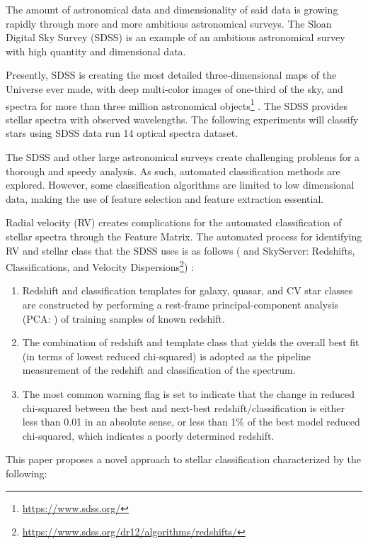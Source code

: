 \documentclass[trackchanges, floatfix, twocolumn, tighten]{aastex62}
\begin{document}
The amount of astronomical data and dimensionality of said data is growing rapidly through more and more ambitious astronomical surveys. The Sloan Digital Sky Survey (SDSS) is an example of an ambitious astronomical survey with high quantity and dimensional data. 

Presently, SDSS is creating the most detailed three-dimensional maps of the Universe ever made, with deep multi-color images of one-third of the sky, and spectra for more than three million astronomical objects\footnote{\url{https://www.sdss.org/}} \cite{York}. The SDSS provides stellar spectra with observed wavelengths. The following experiments will classify stars using SDSS data run 14 optical spectra dataset. 

The SDSS and other large astronomical surveys create challenging problems for a thorough and speedy analysis. As such, automated classification methods are explored. However, some classification algorithms are limited to low dimensional data, making the use of feature selection and feature extraction essential.

Radial velocity (RV) creates complications for the automated classification of stellar spectra through the Feature Matrix. The automated process for identifying RV and stellar class that the SDSS uses is as follows (\cite{Bolton} and SkyServer: Redshifts, Classifications, and Velocity Dispersions\footnote{\url{https://www.sdss.org/dr12/algorithms/redshifts/}}) :

\begin{enumerate}
	\item Redshift and classification templates for galaxy, quasar, and CV star classes are constructed by performing a rest-frame principal-component analysis (PCA: \cite{Shlens}) of training samples of known redshift. 
	\newpage %
	\item The combination of redshift and template class that yields the overall best fit (in terms of lowest reduced chi-squared) is adopted as the pipeline measurement of the redshift and classification of the spectrum.
	\item The most common warning flag is set to indicate that the change in reduced chi-squared between the best and next-best redshift/classification is either less than 0.01 in an absolute sense, or less than 1\% of the best model reduced chi-squared, which indicates a poorly determined redshift.
\end{enumerate}

This paper proposes a novel approach to stellar classification characterized by the following:
\end{document}
